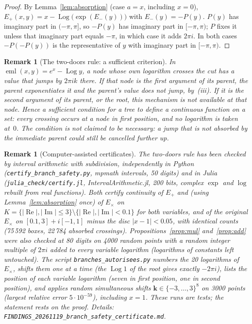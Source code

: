 \documentclass[11pt,a4paper]{article}
\newtheorem{remark}[theorem]{Remark}
\theoremstyle{definition}
\newcommand{\eml}{\operatorname{eml}}
\newcommand{\Log}{\operatorname{Log}}   %
\newcommand{\im}{\operatorname{Im}}
\newcommand{\re}{\operatorname{Re}}
\begin{document}
\begin{proof}
By Lemma~\ref{lem:absorption} (case $a=x$, including $x=0$),
$E_{+}(x,y)=x-\Log\bigl(\exp(E_{-}(y))\bigr)$ with $E_{-}(y)=-P(y)$.
$P(y)$ has imaginary part in $(-\pi,\pi]$, so $-P(y)$ has imaginary part in
$[-\pi,\pi)$; $P$ fixes it unless that imaginary part equals $-\pi$, in which
case it adds $2\pi i$.  In both cases $-P(-P(y))$ is the representative of
$y$ with imaginary part in $[-\pi,\pi)$.
\end{proof}

\begin{remark}[The two-doors rule: a sufficient criterion]
\label{rem:doors}
In $\eml(x,y)=e^{x}-\Log y$, a node whose own logarithm crosses the cut has a
value that jumps by $2\pi i k$ there.  If that node is the \emph{first}
argument of its parent, the parent exponentiates it and the parent's value
does not jump, by~(iii).  If it is the \emph{second} argument of its parent,
or the root, this mechanism is not available at that node.  Hence a
\emph{sufficient} condition for a tree to define a continuous function on a
set: every crossing occurs at a node in first position, and no logarithm is
taken at~$0$.  The condition is not claimed to be necessary: a jump that is
not absorbed by the immediate parent could still be cancelled further up.
\end{remark}

\begin{remark}[Computer-assisted certificates]
\label{rem:certificates}
The two-doors rule has been checked by interval arithmetic with subdivision,
independently in Python (\texttt{certify\_branch\_safety.py}, mpmath
intervals, 50 digits) and in Julia (\texttt{julia\_check/certify.jl},
IntervalArithmetic.jl, 200 bits, complex $\exp$ and $\log$ rebuilt from real
functions).  Both certify continuity of $E_{+}$ and (using
Lemma~\ref{lem:absorption} once) of $E_{\times}$ on
$K=\{|\re|,|\im|\le3\}\setminus\{|\re|,|\im|<0.1\}$ for both variables, and of
the original $E_{\times}$ on $[0.1,3]+i[-1,1]$ minus the disc $|x-1|<0.05$,
with identical counts (75\,592 boxes, 22\,784 absorbed crossings).
Propositions~\ref{prop:mul} and~\ref{prop:add} were also checked at 80 digits
on 4000 random points with a random integer multiple of $2\pi i$ added to
every variable logarithm (logarithms of constants left untouched).  The script
\texttt{branches\_autorisees.py} numbers the 20 logarithms of $E_{\times}$,
shifts them one at a time (the $\Log 1$ of the root gives exactly
$-2\pi i$), lists the position of each variable logarithm (seven in first
position, one in second position), and applies random simultaneous shifts
$\mathbf k\in\{-3,\dots,3\}^8$ on 3000 points (largest relative error
$5\cdot10^{-59}$), including $x=1$.  These runs are tests; the statement
rests on the proof.  Details: \texttt{FINDINGS\_20261119\_branch\_safety\_certificate.md}.
\end{remark}
\end{document}
